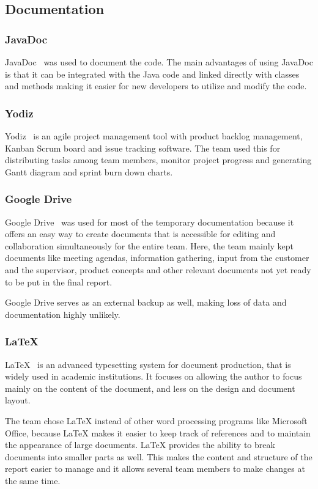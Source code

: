 \subsection{Documentation}

\subsubsection{JavaDoc}
JavaDoc~\cite{javadoc} was used to document the code. The main advantages of using JavaDoc is that it can be integrated with the Java code and linked directly with classes and methods making it easier for new developers to utilize and modify the code.

\subsubsection{Yodiz}
Yodiz~\cite{yodiz} is an agile project management tool with product backlog management, Kanban Scrum board and issue tracking software. The team used this for distributing tasks among team members, monitor project progress and generating Gantt diagram and sprint burn down charts.

\subsubsection{Google Drive}
Google Drive~\cite{gdrive} was used for most of the temporary documentation because it offers an easy way to create documents that is accessible for editing and collaboration simultaneously for the entire team. Here, the team mainly kept documents like meeting agendas, information gathering, input from the customer and the supervisor, product concepts and other relevant documents not yet ready to be put in the final report. 

Google Drive serves as an external backup as well, making loss of data and documentation highly unlikely.

\subsubsection{\LaTeX}
LaTeX~\cite{latex} is an advanced typesetting system for document production, that is widely used in
academic institutions. It focuses on allowing the author to focus mainly on the content of the document, and less on the design and document layout.

The team chose LaTeX instead of other word processing programs like Microsoft Office, because LaTeX makes it easier to keep track of references and to maintain the appearance of large documents. 
LaTeX provides the ability to break documents into smaller parts as well. This makes the content and structure of the report easier to manage and it allows several team members to make changes at the same time.


